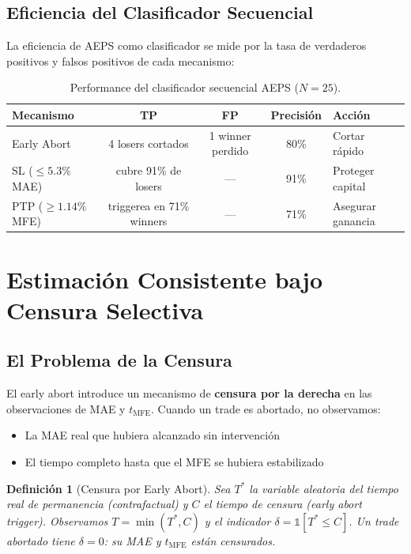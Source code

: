 \documentclass[11pt,a4paper]{article}
\newtheorem{definition}{Definici\'on}[section]
\begin{document}
\subsection{Eficiencia del Clasificador Secuencial}

La eficiencia de AEPS como clasificador se mide por la tasa de
verdaderos positivos y falsos positivos de cada mecanismo:

\begin{table}[H]
\centering
\caption{Performance del clasificador secuencial AEPS ($N=25$).}
\label{tab:classifier_perf}
\begin{tabular}{lcccl}
\toprule
\textbf{Mecanismo} & \textbf{TP} & \textbf{FP} & \textbf{Precisi\'on} & \textbf{Acci\'on} \\
\midrule
Early Abort & 4 losers cortados & 1 winner perdido & 80\% & Cortar r\'apido \\
SL ($\leq 5.3\%$ MAE) & cubre 91\% de losers & --- & 91\% & Proteger capital \\
PTP ($\geq 1.14\%$ MFE) & triggerea en 71\% winners & --- & 71\% & Asegurar ganancia \\
\bottomrule
\end{tabular}
\end{table}


\section{Estimaci\'on Consistente bajo Censura Selectiva}
\label{sec:censoring}

\subsection{El Problema de la Censura}

El early abort introduce un mecanismo de \textbf{censura por la
derecha} en las observaciones de MAE y $t_{\text{MFE}}$. Cuando
un trade es abortado, no observamos:

\begin{itemize}[leftmargin=1.5em]
\item La MAE real que hubiera alcanzado sin intervenci\'on
\item El tiempo completo hasta que el MFE se hubiera estabilizado
\end{itemize}

\begin{definition}[Censura por Early Abort]
\label{def:censoring}
Sea $T^*$ la variable aleatoria del tiempo real de permanencia
(contrafactual) y $C$ el tiempo de censura (early abort trigger).
Observamos $T = \min(T^*, C)$ y el indicador
$\delta = \mathbb{1}[T^* \leq C]$. Un trade abortado tiene
$\delta = 0$: su MAE y $t_{\text{MFE}}$ est\'an censurados.
\end{definition}
\end{document}
